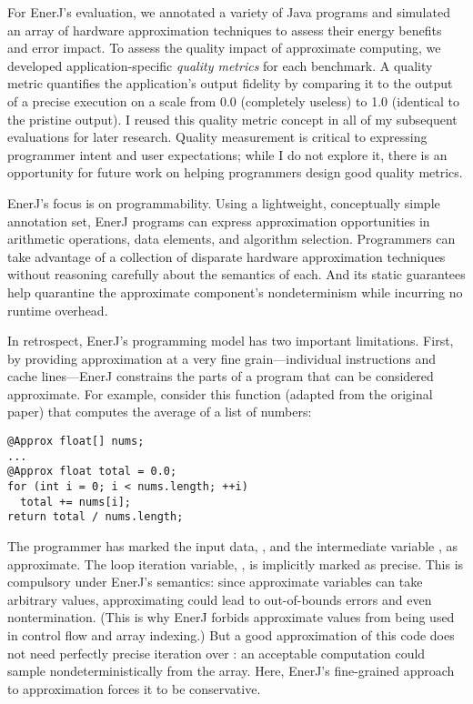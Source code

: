 For EnerJ's evaluation, we annotated a variety of Java
programs and simulated an array of hardware approximation techniques to assess
their energy benefits and error impact. To assess the quality impact of
approximate computing, we developed application-specific \emph{quality
metrics} for each benchmark. A quality metric quantifies the application's
output fidelity by comparing it to the output of a precise execution on a
scale from 0.0 (completely useless) to 1.0 (identical to the pristine output).
I reused this quality metric concept in all of my subsequent evaluations for
later research. Quality measurement is critical to expressing programmer
intent and user expectations; while I do not explore it, there is an
opportunity for future work on helping programmers design good quality
metrics.

EnerJ's focus is on programmability. Using a lightweight, conceptually simple
annotation set, EnerJ programs can express approximation opportunities in
arithmetic operations, data elements, and algorithm selection. Programmers can
take advantage of a collection of disparate hardware approximation techniques
without reasoning carefully about the semantics of each. And its static
guarantees help quarantine the approximate component's nondeterminism while
incurring no runtime overhead.

In retrospect, EnerJ's programming model has two important limitations. First,
by providing approximation at a very fine grain---individual instructions and
cache lines---EnerJ constrains the parts of a program that can be
considered approximate. For example, consider this function (adapted from the original
paper) that computes the average of a list of numbers:

\begin{lstlisting}
@Approx float[] nums;
...
@Approx float total = 0.0;
for (int i = 0; i < nums.length; ++i)
  total += nums[i];
return total / nums.length;
\end{lstlisting}

The programmer has marked the input data, , and the intermediate
variable , as approximate.
The loop iteration variable, , is implicitly marked as precise. This
is compulsory under EnerJ's semantics: since approximate variables can take
arbitrary values, approximating  could lead to out-of-bounds errors
and even nontermination. (This is why EnerJ forbids approximate values from
being used in control flow and array indexing.) But a good approximation
of this code does not need perfectly precise iteration over : an
acceptable computation could sample nondeterministically from the array.
Here, EnerJ's fine-grained approach to approximation forces it to be
conservative.

